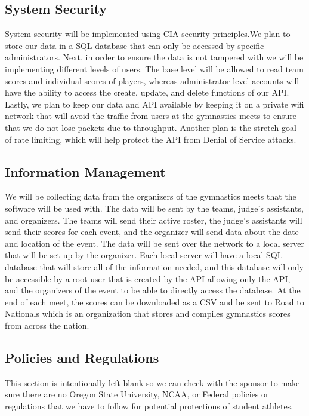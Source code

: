 \documentclass[letterpaper,10pt,draftclsnofoot,onecolumn,]{article}
\begin{document}
\subsection{System Security}
System security will be implemented using CIA security principles.We plan to store our data in a SQL database that can only be accessed by specific administrators. Next, in order to ensure the data is not tampered with we will be implementing different levels of users. The base level will be allowed to read team scores and individual scores of players, whereas administrator level accounts will have the ability to access the create, update, and delete functions of our API. Lastly, we plan to keep our data and API available by keeping it on a private wifi network that will avoid the traffic from users at the gymnastics meets to ensure that we do not lose packets due to throughput. Another plan is the stretch goal of rate limiting, which will help protect the API from Denial of Service attacks.

\subsection{Information Management}
We will be collecting data from the organizers of the gymnastics meets that the software will be used with. The data will be sent by the teams, judge's assistants, and organizers. The teams will send their active roster, the judge's assistants will send their scores for each event, and the organizer will send data about the date and location of the event. The data will be sent over the network to a local server that will be set up by the organizer. Each local server will have a local SQL database that will store all of the information needed, and this database will only be accessible by a root user that is created by the API allowing only the API, and the organizers of the event to be able to directly access the database. At the end of each meet, the scores can be downloaded as a CSV and be sent to Road to Nationals which is an organization that stores and compiles gymnastics scores from across the nation.

\subsection{Policies and Regulations}
This section is intentionally left blank so we can check with the sponsor to make sure there are no Oregon State University, NCAA, or Federal policies or regulations that we have to follow for potential protections of student athletes.
\end{document}
